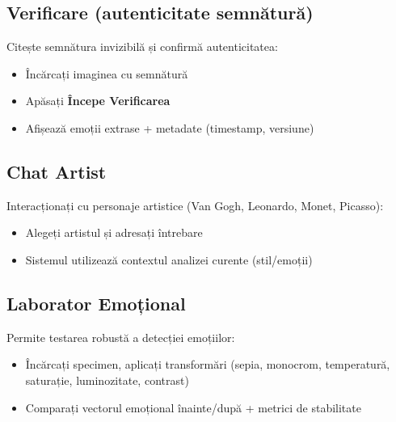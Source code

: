 
\subsection{Verificare (autenticitate semnătură)}
Citește semnătura invizibilă și confirmă autenticitatea:
\begin{itemize}[noitemsep,topsep=2pt]
  \item Încărcați imaginea cu semnătură
  \item Apăsați \textbf{Începe Verificarea}
  \item Afișează emoții extrase + metadate (timestamp, versiune)
\end{itemize}


\subsection{Chat Artist}
Interacționați cu personaje artistice (Van Gogh, Leonardo, Monet, Picasso):
\begin{itemize}[noitemsep,topsep=2pt]
  \item Alegeți artistul și adresați întrebare
  \item Sistemul utilizează contextul analizei curente (stil/emoții)
\end{itemize}


\subsection{Laborator Emoțional}
Permite testarea robustă a detecției emoțiilor:
\begin{itemize}[noitemsep,topsep=2pt]
  \item Încărcați specimen, aplicați transformări (sepia, monocrom, temperatură, saturație, luminozitate, contrast)
  \item Comparați vectorul emoțional înainte/după + metrici de stabilitate
\end{itemize}


